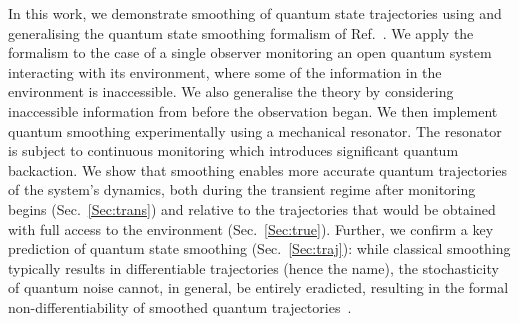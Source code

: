 \documentclass[aps,prx,twocolumn,amsmath,amssymb,superscriptaddress,floatfix,longbibliography
]{revtex4-2}
\begin{document}

In this work, we demonstrate smoothing of quantum state trajectories using and generalising the quantum state smoothing formalism of Ref.~\cite{guevara2015quantum}. We apply the formalism to the case of a single observer monitoring an open quantum system interacting with its environment, where some of the information in the environment is inaccessible. We also generalise the theory by considering inaccessible information from before the observation began. We then implement quantum smoothing experimentally using a mechanical resonator. The resonator is subject to continuous monitoring which introduces significant quantum backaction. We show that smoothing enables more accurate quantum trajectories of the system’s dynamics, both during the transient regime after monitoring begins (Sec.~\ref{Sec:trans}) and relative to the trajectories that would be obtained with full access to the environment (Sec.~\ref{Sec:true}). Further, we confirm a key prediction of quantum state smoothing (Sec.~\ref{Sec:traj}): while classical smoothing typically results in differentiable trajectories (hence the name), the stochasticity of quantum noise cannot, in general, be entirely eradicted, resulting in the formal non-differentiability of smoothed quantum trajectories~\cite{laverick2021quantum}. 
\end{document}
